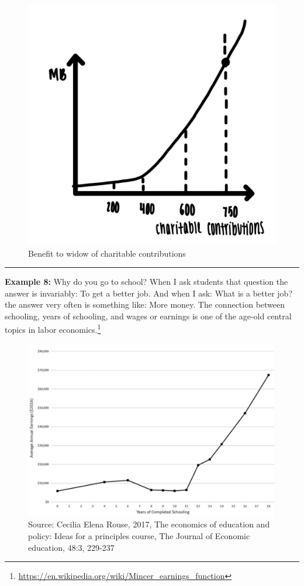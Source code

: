 \documentclass[
]{book}
\begin{document}
\begin{figure}

{\centering \includegraphics[width=0.75\linewidth]{img/rationalchoice/fig10} 

}

\caption{Benefit to widow of charitable contributions}\label{fig:rationalchoice10}
\end{figure}

\begin{center}\rule{0.5\linewidth}{0.5pt}\end{center}

\textbf{Example 8:} Why do you go to school? When I ask students that question the answer is invariably: To get a better job. And when I ask: What is a better job? the answer very often is something like: More money. The connection between schooling, years of schooling, and wages or earnings is one of the age-old central topics in labor economics.\footnote{\url{https://en.wikipedia.org/wiki/Mincer_earnings_function}}

\begin{figure}

{\centering \includegraphics[width=1\linewidth]{img/rationalchoice/fig11} 

}

\caption{Source: Cecilia Elena Rouse, 2017, The economics of education and policy: Ideas for a principles course, The Journal of Economic education, 48:3, 229-237}\label{fig:rationalchoice11}
\end{figure}
\end{document}
